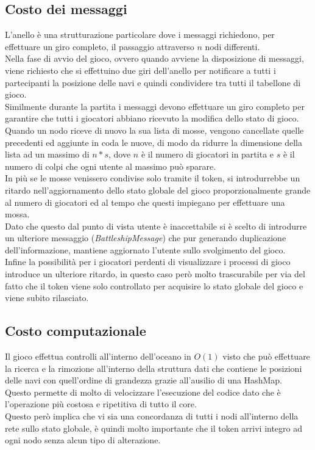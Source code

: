 \documentclass{llncs}
\begin{document}
\subsection{Costo dei messaggi}
L'anello è una strutturazione particolare dove i messaggi richiedono, per effettuare un giro completo, il passaggio attraverso $n$ nodi differenti.\\
Nella fase di avvio del gioco, ovvero quando avviene la disposizione di messaggi, viene richiesto che si effettuino due giri dell'anello per notificare a tutti i partecipanti la posizione delle navi e quindi condividere tra tutti il tabellone di gioco.\\
Similmente durante la partita i messaggi devono effettuare un giro completo per garantire che tutti i giocatori abbiano ricevuto la modifica dello stato di gioco. Quando un nodo riceve di nuovo la sua lista di mosse, vengono cancellate quelle precedenti ed aggiunte in coda le nuove, di modo da ridurre la dimensione della lista ad un massimo di $n*s$, dove $n$ è il numero di giocatori in partita e $s$ è il numero di colpi che ogni utente al massimo può sparare.\\
In più se le mosse venissero condivise solo tramite il token, si introdurrebbe un ritardo nell'aggiornamento dello stato globale del gioco proporzionalmente grande al numero di giocatori ed al tempo che questi impiegano per effettuare una mossa.\\
Dato che questo dal punto di vista utente è inaccettabile si è scelto di introdurre un ulteriore messaggio (\emph{BattleshipMessage}) che pur generando duplicazione dell'informazione, mantiene aggiornato l'utente sullo svolgimento del gioco.\\
Infine la possibilità per i giocatori perdenti di visualizzare i processi di gioco introduce un ulteriore ritardo, in questo caso però molto trascurabile per via del fatto che il token viene solo controllato per acquisire lo stato globale del gioco e viene subito rilasciato.
\subsection{Costo computazionale}
Il gioco effettua controlli all'interno dell'oceano in $O(1)$ visto che può effettuare la ricerca e la rimozione all'interno della struttura dati che contiene le posizioni delle navi con quell'ordine di grandezza grazie all'ausilio di una HashMap.\\
Questo permette di molto di velocizzare l'esecuzione del codice dato che è l'operazione più costosa e ripetitiva di tutto il core.\\
Questo però implica che vi sia una concordanza di tutti i nodi all'interno della rete sullo stato globale, è quindi molto importante che il token arrivi integro ad ogni nodo senza alcun tipo di alterazione. 
\end{document}
